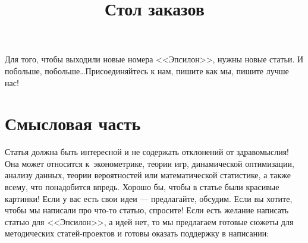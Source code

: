 \documentclass[final,pdftex]{../../template/epsilonj}
\begin{document}
\setcounter{page}{59}

\begin{frontmatter}
\title{Стол заказов}

\begin{aug}
\author{ }%



\end{aug}



\end{frontmatter}





Для того, чтобы выходили новые номера <<Эпсилон>>, нужны новые статьи. И побольше, побольше\ldots Присоединяйтесь к нам, пишите как мы, пишите лучше нас!




\section{Смысловая часть}

Статья должна быть интересной и не содержать отклонений от здравомыслия! Она может относится к~эконометрике, теории игр, динамической оптимизации, анализу данных, теории вероятностей или математической статистике, а также всему, что понадобится впредь. Хорошо бы, чтобы в статье были красивые картинки! Если у вас есть свои идеи --- предлагайте, обсудим. Если вы хотите, чтобы мы написали про что-то статью, спросите! Если есть желание написать статью для <<Эпсилон>>, а идей нет, то мы предлагаем готовые сюжеты для методических статей-проектов и готовы оказать поддержку в написании:
\end{document}
